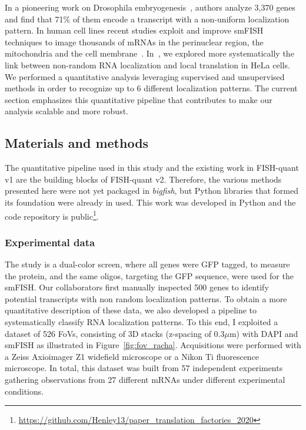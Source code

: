 In a pioneering work on Drosophila embryogenesis~\cite{lecuyer_global_2007}, authors analyze 3,370 genes and find that 71\% of them encode a transcript with a non-uniform localization pattern.
In human cell lines recent studies exploit and improve \ac{smFISH} techniques to image thousands of \ac{mRNA}s in the perinuclear region, the mitochondria and the cell membrane~\cite{battich_image-based_2013, Chen_2015, eng_seqfish_2019, Xia_2019}.
In~\cite{CHOUAIB_2020}, we explored more systematically the link between non-random \ac{RNA} localization and local translation in HeLa cells.
We performed a quantitative analysis leveraging supervised and unsupervised methods in order to recognize up to 6 different localization patterns.
The current section emphasizes this quantitative pipeline that contributes to make our analysis scalable and more robust.

\subsection{Materials and methods}
\label{subsec:materials_general_pattern}

The quantitative pipeline used in this study and the existing work in FISH-quant v1 are the building blocks of FISH-quant v2.
Therefore, the various methods presented here were not yet packaged in \emph{bigfish}, but Python libraries that formed its foundation were already in used.
This work was developed in Python and the code repository is public\footnote{\url{https://github.com/Henley13/paper_translation_factories_2020}}.

\subsubsection{Experimental data}

The study is a dual-color screen, where all genes were GFP tagged, to measure the protein, and the same oligos, targeting the GFP sequence, were used for the \ac{smFISH}.
Our collaborators first manually inspected 500 genes to identify potential transcripts with non random localization patterns.
To obtain a more quantitative description of these data, we also developed a pipeline to systematically classify \ac{RNA} localization patterns.
To this end, I exploited a dataset of 526 \ac{FoV}s, consisting of 3D stacks (z-spacing of 0.3$\mu$m) with DAPI and \ac{smFISH} as illustrated in Figure~\ref{fig:fov_racha}.
Acquisitions were performed with a Zeiss Axioimager Z1 widefield microscope or a Nikon Ti fluorescence microscope.
In total, this dataset was built from 57 independent experiments gathering observations from 27 different \ac{mRNA}s under different experimental conditions.

